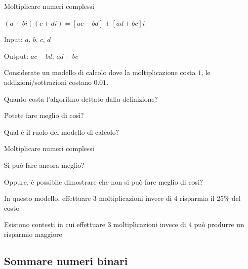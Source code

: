 \begin{frame}{Moltiplicare numeri complessi}

\vspace{-9pt}
\begin{myboxtitle}
\BI
\item $(a + bi)(c + di) = [ac-bd] + [ad + bc] i$
\item Input: $a$, $b$, $c$, $d$
\item Output: $ac-bd$, $ad+bc$
\EI
\end{myboxtitle}

\begin{myboxtitle}[Domande]
Considerate un modello di calcolo dove la moltiplicazione costa $1$, le addizioni/sottrazioni costano $0.01$.
\BI
\item Quanto costa l'algoritmo dettato dalla definizione?
\item Potete fare meglio di così? 
\item Qual è il ruolo del modello di calcolo?
\EI
\end{myboxtitle}	

\end{frame}

\begin{frame}{Moltiplicare numeri complessi}

\vspace{-9pt}
\begin{myboxtitle}
\BI
\item Si può fare ancora meglio? 
\item Oppure, è possibile dimostrare che non si può fare meglio di così?
\EI
\end{myboxtitle}

\begin{myboxtitle}
\BI
\item In questo modello, effettuare 3 moltiplicazioni invece di 4 risparmia il 25\% del costo
\item Esistono contesti in cui effettuare 3 moltiplicazioni invece di 4 può produrre un risparmio maggiore
\EI
\end{myboxtitle}

\end{frame}

\subsection{Sommare numeri binari}

